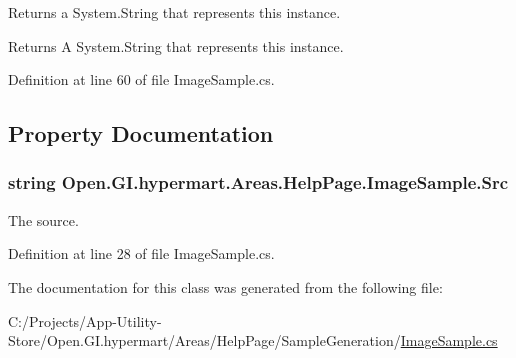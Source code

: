 Returns a System.\+String that represents this instance. 

\begin{DoxyReturn}{Returns}
A System.\+String that represents this instance. 
\end{DoxyReturn}


Definition at line 60 of file Image\+Sample.\+cs.



\subsection{Property Documentation}
\hypertarget{class_open_1_1_g_i_1_1hypermart_1_1_areas_1_1_help_page_1_1_image_sample_a19a1c712823d2e81590e2be51f2e30fb}{}
\subsubsection[{Src}]{\setlength{\rightskip}{0pt plus 5cm}string Open.\+G\+I.\+hypermart.\+Areas.\+Help\+Page.\+Image\+Sample.\+Src\hspace{0.3cm}{\ttfamily [get]}}\label{class_open_1_1_g_i_1_1hypermart_1_1_areas_1_1_help_page_1_1_image_sample_a19a1c712823d2e81590e2be51f2e30fb}




The source. 

Definition at line 28 of file Image\+Sample.\+cs.



The documentation for this class was generated from the following file\+:\begin{DoxyCompactItemize}
\item 
C\+:/\+Projects/\+App-\/\+Utility-\/\+Store/\+Open.\+G\+I.\+hypermart/\+Areas/\+Help\+Page/\+Sample\+Generation/\hyperlink{_image_sample_8cs}{Image\+Sample.\+cs}\end{DoxyCompactItemize}
